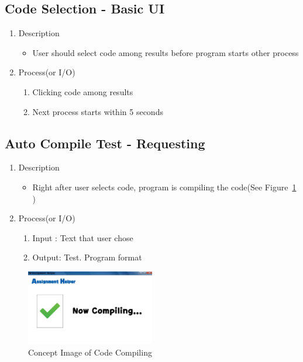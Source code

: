 \documentclass[conference]{IEEEtran}
\begin{document}
\subsection{Code Selection - Basic UI}

\begin{enumerate}
  \item Description
  \begin{itemize}
    \item User should select code among results before program starts other process
  \end{itemize}
  \item Process(or I/O)
  \begin{enumerate}
    \item Clicking code among results
    \item Next process starts within 5 seconds
  \end{enumerate}
\end{enumerate}


\textit{}

\subsection{Auto Compile Test - Requesting}

\begin{enumerate}
  \item Description
  \begin{itemize}
    \item Right after user selects code, program is compiling the code(See Figure~\ref{fig_concept_code_compile} )
  \end{itemize}
  \item Process(or I/O)
  \begin{enumerate}
    \item Input : Text that user chose
    \item Output: Test. Program format
  \end{enumerate}
\end{enumerate}

\textit{}
\begin{figure}[h]
\centering
\includegraphics[width=0.5\textwidth]{./figures/UI_code_validation.jpg}
\caption{Concept Image of Code Compiling}
\label{fig_concept_code_compile}
\end{figure}
\end{document}
